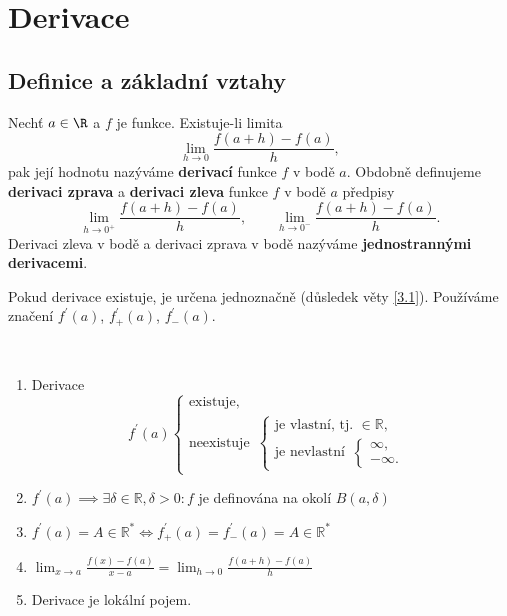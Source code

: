\section{Derivace}
\subsection{Definice a základní vztahy}
\begin{definice}
Nechť $a\in\R$ a $f$ je funkce. Existuje-li limita
\[
\lim_{h\to 0} \frac{f(a+h)-f(a)}{h},
\]
pak její hodnotu nazýváme \textbf{derivací} funkce $f$ v bodě $a$. Obdobně definujeme \textbf{derivaci zprava} a \textbf{derivaci zleva} funkce $f$ v bodě $a$ předpisy
\[
\lim_{h\to 0^+} \frac{f(a+h)-f(a)}{h},\qquad \lim_{h\to 0^-} \frac{f(a+h)-f(a)}{h}.
\]
Derivaci zleva v bodě a derivaci zprava v bodě nazýváme \textbf{jednostrannými derivacemi}.
\end{definice}

\begin{oznaceni}
	Pokud derivace existuje, je určena jednoznačně (důsledek věty \ref{3.1}). Používáme značení
	$f^\prime(a)$, $f_+^\prime(a)$, $f_-^\prime(a)$.
\end{oznaceni}

\begin{poznamka}\,
\begin{enumerate}[$i$.]
	\item Derivace
	$$f^\prime(a)
 \begin{cases}
		\textrm{existuje}, \\
		\textrm{neexistuje} \,\,\,\begin{cases}
			\textrm{je vlastní, tj. }\in \mathbb R, \\
			\textrm{je nevlastní} \,\,\, \begin{cases}
				\infty, \\
				-\infty.
\end{cases}
\end{cases}
 \end{cases}
	$$
	\item $f^\prime (a) \implies \exists \delta \in \mathbb R , \delta > 0: f$ je definována na okolí $B(a,\delta)$
	\item $f^\prime(a) = A\in \mathbb R ^* \iff f_+^\prime(a) = f_-^\prime (a) = A\in \mathbb R ^*$
	\item $\lim_{x\to a} \frac{f(x)-f(a)}{x-a} = \lim_{h\to 0} \frac{f(a+h)-f(a)}{h}$
	\item Derivace je lokální pojem.
\end{enumerate}
\end{poznamka}

